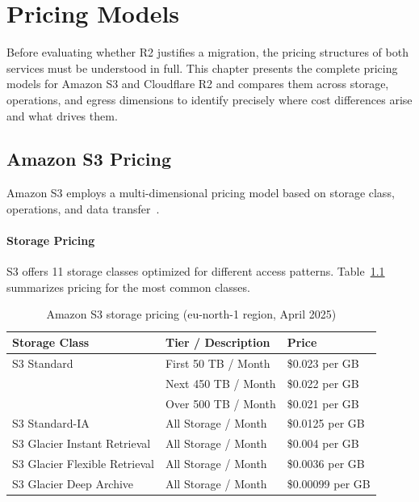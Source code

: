 
\chapter{Pricing Models}\label{chapter:pricing}

Before evaluating whether R2 justifies a migration, the pricing structures of both services must be understood in full. This chapter presents the complete pricing models for Amazon S3 and Cloudflare R2 and compares them across storage, operations, and egress dimensions to identify precisely where cost differences arise and what drives them.

\section{Amazon S3 Pricing}\label{sec:s3-pricing}

Amazon S3 employs a multi-dimensional pricing model based on storage class, operations, and data transfer~\cite{aws-s3-pricing}.

\subsubsection{Storage Pricing} 
S3 offers 11 storage classes optimized for different access patterns. Table~\ref{tab:s3-storage-pricing} summarizes pricing for the most common classes.

\begin{table}[H]
\centering
\caption{Amazon S3 storage pricing (eu-north-1 region, April 2025)}
\label{tab:s3-storage-pricing}
\begin{tabular}{p{5.5cm}p{5cm}p{4cm}}
\hline
\textbf{Storage Class} & \textbf{Tier / Description} & \textbf{Price} \\
\hline
S3 Standard & First 50 TB / Month & \$0.023 per GB \\
 & Next 450 TB / Month & \$0.022 per GB \\
 & Over 500 TB / Month & \$0.021 per GB \\
\hline
S3 Standard-IA & All Storage / Month & \$0.0125 per GB \\
\hline
S3 Glacier Instant Retrieval & All Storage / Month & \$0.004 per GB \\
\hline
S3 Glacier Flexible Retrieval & All Storage / Month & \$0.0036 per GB \\
\hline
S3 Glacier Deep Archive & All Storage / Month & \$0.00099 per GB \\
\hline
\end{tabular}
\end{table}


